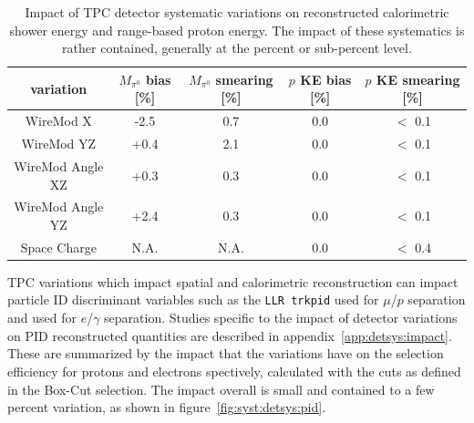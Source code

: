 \begin{table}[H]
\centering
\setlength{\tabcolsep}{10pt}
\renewcommand{\arraystretch}{1.25}
 \begin{tabular}{| c | c | c | c | c |} 
 \hline
 variation & $M_{\pi^0}$ bias [\%] & $M_{\pi^0}$ smearing [\%] & $p$ KE bias [\%] & $p$ KE smearing [\%]  \\
 \hline
WireMod X & -2.5 & 0.7 & 0.0 & $<$ 0.1 \\
WireMod YZ & +0.4 & 2.1 & 0.0 & $<$ 0.1 \\
WireMod Angle XZ & +0.3 & 0.3 & 0.0 & $<$ 0.1 \\
WireMod Angle YZ & +2.4 & 0.3 & 0.0 & $<$ 0.1 \\
Space Charge & N.A. & N.A. & 0.0 & $<$ 0.4 \\
 \hline
 \end{tabular}
 \caption{\label{tab:energyvar} Impact of TPC detector systematic variations on reconstructed calorimetric shower energy and range-based proton energy. The impact of these systematics is rather contained, generally at the percent or sub-percent level.}
\end{table}


TPC variations which impact spatial and calorimetric reconstruction can impact particle ID discriminant variables such as the \texttt{LLR trkpid} used for $\mu$/$p$ separation and \dedx used for $e$/$\gamma$ separation. Studies specific to the impact of detector variations on PID reconstructed quantities are described in appendix~\ref{app:detsys:impact}. These are summarized by the impact that the variations have on the selection efficiency for protons and electrons spectively, calculated with the cuts as defined in the \npsel Box-Cut selection. The impact overall is small and contained to a few percent variation, as shown in figure~\ref{fig:syst:detsys:pid}.

